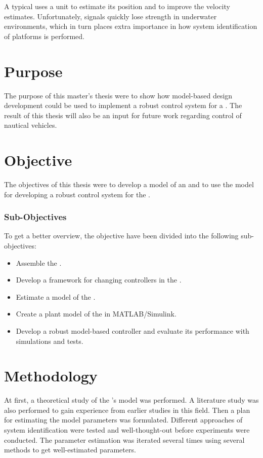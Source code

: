 A typical \abbrUV uses a \abbrGPS unit to estimate its position and to improve the velocity estimates. Unfortunately, \abbrGPS signals quickly lose strength in underwater environments, which in turn places extra importance in how system identification of \abbrROV platforms is performed.


\section{Purpose}
The purpose of this master's thesis were to show how model-based design development could be used to implement a robust control system for a \abbrROV. The result of this thesis will also be an input for future work regarding control of nautical vehicles. 


\section{Objective}
The objectives of this thesis were to develop a model of an \abbrROV and to use the model for developing a robust control system for the \abbrROV.

\subsubsection{Sub-Objectives}
To get a better overview, the objective have been divided into the following sub-objectives:
\begin{itemize}
    \item Assemble the \abbrROV.
    \item Develop a framework for changing controllers in the \abbrROV.
    \item Estimate a model of the \abbrROV.
    \item Create a plant model of the \abbrROV in MATLAB/Simulink.
    \item Develop a robust model-based controller and evaluate its performance with simulations and tests.
\end{itemize}

\section{Methodology}
At first, a theoretical study of the \abbrROV's model was performed. A literature study was also performed to gain experience from earlier studies in this field. Then a plan for estimating the model parameters was formulated. Different approaches of system identification were tested and well-thought-out before experiments were conducted. The parameter estimation was iterated several times using several methods to get well-estimated parameters. 

